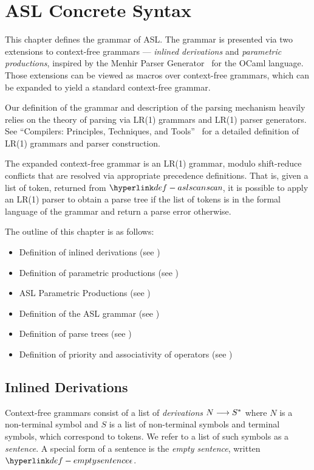 \chapter{ASL Concrete Syntax \label{chap:parsing}}

This chapter defines the grammar of ASL. The grammar is presented via two extensions
to context-free grammars --- \emph{inlined derivations} and \emph{parametric productions},
inspired by the Menhir Parser Generator~\cite{MenhirManual} for the OCaml language.
Those extensions can be viewed as macros over context-free grammars, which can be
expanded to yield a standard context-free grammar.

Our definition of the grammar and description of the parsing mechanism heavily relies
on the theory of parsing via LR(1) grammars and LR(1) parser generators.
%
See ``Compilers: Principles, Techniques, and Tools''~\cite{ASU86} for a detailed
definition of LR(1) grammars and parser construction.

The expanded context-free grammar is an LR(1) grammar, modulo shift-reduce
conflicts that are resolved via appropriate precedence definitions.
That is, given a list of token, returned from $\aslscan$, it is possible to apply
an LR(1) parser to obtain a parse tree if the list of tokens is in the formal language
of the grammar and return a parse error otherwise.

The outline of this chapter is as follows:
\begin{itemize}
  \item Definition of inlined derivations (see )
  \item Definition of parametric productions (see )
  \item ASL Parametric Productions (see )
  \item Definition of the ASL grammar (see )
  \item Definition of parse trees (see )
  \item Definition of priority and associativity of operators (see )
\end{itemize}

\section{Inlined Derivations \label{sec:InlinedDerivations}}
Context-free grammars consist of a list of \emph{derivations} $N \longrightarrow S^*$
where $N$ is a non-terminal symbol and $S$ is a list of non-terminal symbols and terminal symbols,
which correspond to tokens.
We refer to a list of such symbols as a \emph{sentence}.
A special form of a sentence is the \emph{empty sentence}, written $\emptysentence$.

